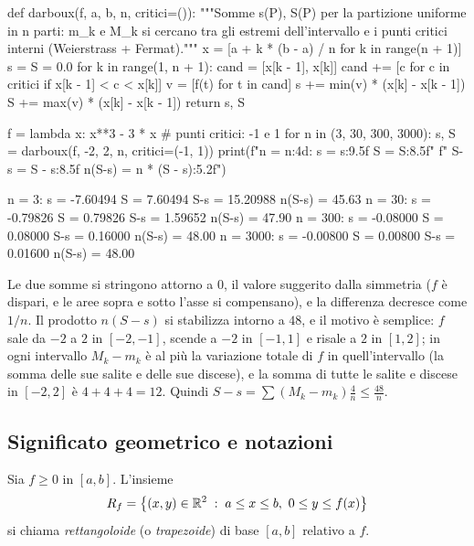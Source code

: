 \begin{python}
def darboux(f, a, b, n, critici=()):
    """Somme s(P), S(P) per la partizione uniforme in n parti:
    m_k e M_k si cercano tra gli estremi dell'intervallo e i
    punti critici interni (Weierstrass + Fermat)."""
    x = [a + k * (b - a) / n for k in range(n + 1)]
    s = S = 0.0
    for k in range(1, n + 1):
        cand = [x[k - 1], x[k]]
        cand += [c for c in critici if x[k - 1] < c < x[k]]
        v = [f(t) for t in cand]
        s += min(v) * (x[k] - x[k - 1])
        S += max(v) * (x[k] - x[k - 1])
    return s, S

f = lambda x: x**3 - 3 * x            # punti critici: -1 e 1
for n in (3, 30, 300, 3000):
    s, S = darboux(f, -2, 2, n, critici=(-1, 1))
    print(f"n = {n:4d}: s = {s:9.5f}  S = {S:8.5f}"
          f"  S-s = {S - s:8.5f}  n(S-s) = {n * (S - s):5.2f}")
\end{python}
\begin{risultato}
n =    3: s =  -7.60494  S =  7.60494  S-s = 15.20988  n(S-s) = 45.63
n =   30: s =  -0.79826  S =  0.79826  S-s =  1.59652  n(S-s) = 47.90
n =  300: s =  -0.08000  S =  0.08000  S-s =  0.16000  n(S-s) = 48.00
n = 3000: s =  -0.00800  S =  0.00800  S-s =  0.01600  n(S-s) = 48.00
\end{risultato}

Le due somme si stringono attorno a $0$, il valore suggerito dalla simmetria ($f$ è
dispari, e le aree sopra e sotto l'asse si compensano), e la differenza decresce come
$1/n$. Il prodotto $n(S-s)$ si stabilizza intorno a $48$, e il motivo è semplice: $f$
sale da $-2$ a $2$ in $[-2,-1]$, scende a $-2$ in $[-1,1]$ e risale a $2$ in $[1,2]$;
in ogni intervallo $M_{k}-m_{k}$ è al più la variazione totale di $f$ in
quell'intervallo (la somma delle sue salite e delle sue discese), e la somma di tutte le
salite e discese in $[-2,2]$ è $4+4+4=12$. Quindi
$S-s=\sum(M_{k}-m_{k})\frac4n\le\frac{48}n$.

\subsection{Significato geometrico e notazioni}

\begin{definizione}[Rettangoloide]\label{def:rettangoloide}
Sia $f\ge0$ in $[a,b]$. L'insieme
\begin{equation}\label{eq:rettangoloide}
  R_{f}=\left\{ (x,y)\in\mathbb{R}^{2} \;:\; a\le x\le b,\ 0\le y\le f(x) \right\}
\end{equation}
si chiama \emph{rettangoloide} (o \emph{trapezoide}) di base $[a,b]$ relativo a $f$.
\end{definizione}

